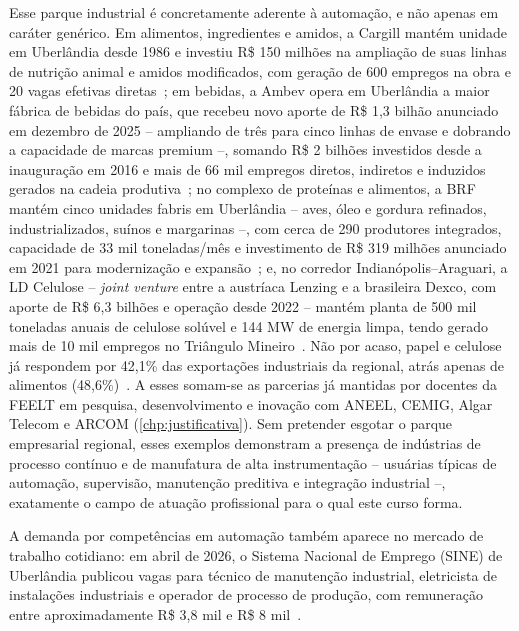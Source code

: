 Esse parque industrial é concretamente aderente à automação, e não apenas em caráter genérico. Em alimentos, ingredientes e amidos, a Cargill mantém unidade em Uberlândia desde 1986 e investiu R\$ 150 milhões na ampliação de suas linhas de nutrição animal e amidos modificados, com geração de 600 empregos na obra e 20 vagas efetivas diretas~\cite{cargill_uberlandia_investimento}; em bebidas, a Ambev opera em Uberlândia a maior fábrica de bebidas do país, que recebeu novo aporte de R\$ 1,3 bilhão anunciado em dezembro de 2025 -- ampliando de três para cinco linhas de envase e dobrando a capacidade de marcas premium --, somando R\$ 2 bilhões investidos desde a inauguração em 2016 e mais de 66 mil empregos diretos, indiretos e induzidos gerados na cadeia produtiva~\cite{ambev_uberlandia_investimento_2025}; no complexo de proteínas e alimentos, a BRF mantém cinco unidades fabris em Uberlândia -- aves, óleo e gordura refinados, industrializados, suínos e margarinas --, com cerca de 290 produtores integrados, capacidade de 33 mil toneladas/mês e investimento de R\$ 319 milhões anunciado em 2021 para modernização e expansão~\cite{brf_uberlandia_unidade}; e, no corredor Indianópolis--Araguari, a LD Celulose -- \textit{joint venture} entre a austríaca Lenzing e a brasileira Dexco, com aporte de R\$ 6,3 bilhões e operação desde 2022 -- mantém planta de 500 mil toneladas anuais de celulose solúvel e 144 MW de energia limpa, tendo gerado mais de 10 mil empregos no Triângulo Mineiro~\cite{ld_celulose_planta}. Não por acaso, papel e celulose já respondem por 42,1\% das exportações industriais da regional, atrás apenas de alimentos (48,6\%)~\cite{fiemg_painel_vale_paranaiba_2026}. A esses somam-se as parcerias já mantidas por docentes da FEELT em pesquisa, desenvolvimento e inovação com ANEEL, CEMIG, Algar Telecom e ARCOM (\autoref{chp:justificativa}). Sem pretender esgotar o parque empresarial regional, esses exemplos demonstram a presença de indústrias de processo contínuo e de manufatura de alta instrumentação -- usuárias típicas de automação, supervisão, manutenção preditiva e integração industrial --, exatamente o campo de atuação profissional para o qual este curso forma.

A demanda por competências em automação também aparece no mercado de trabalho cotidiano: em abril de 2026, o Sistema Nacional de Emprego (SINE) de Uberlândia publicou vagas para técnico de manutenção industrial, eletricista de instalações industriais e operador de processo de produção, com remuneração entre aproximadamente R\$ 3,8 mil e R\$ 8 mil~\cite{sine_uberlandia_vagas_2026}.

